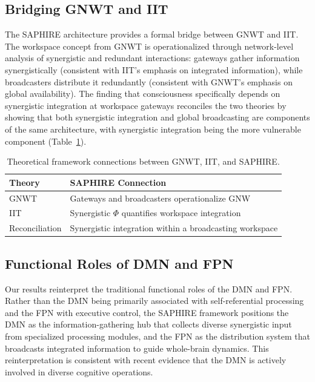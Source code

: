 \documentclass[11pt]{article}
\begin{document}
\subsection{Bridging GNWT and IIT}

The SAPHIRE architecture provides a formal bridge between GNWT and IIT. The workspace concept from GNWT is operationalized through network-level analysis of synergistic and redundant interactions: gateways gather information synergistically (consistent with IIT's emphasis on integrated information), while broadcasters distribute it redundantly (consistent with GNWT's emphasis on global availability). The finding that consciousness specifically depends on synergistic integration at workspace gateways reconciles the two theories by showing that both synergistic integration and global broadcasting are components of the same architecture, with synergistic integration being the more vulnerable component (Table~\ref{tab:theories}).

\begin{table}[htbp]
\centering
\caption{Theoretical framework connections between GNWT, IIT, and SAPHIRE.}
\label{tab:theories}
\begin{tabular}{ll}
\toprule
Theory & SAPHIRE Connection \\
\midrule
GNWT & Gateways and broadcasters operationalize GNW \\
IIT & Synergistic $\Phi$ quantifies workspace integration \\
Reconciliation & Synergistic integration within a broadcasting workspace \\
\bottomrule
\end{tabular}
\end{table}

\subsection{Functional Roles of DMN and FPN}

Our results reinterpret the traditional functional roles of the DMN and FPN. Rather than the DMN being primarily associated with self-referential processing and the FPN with executive control, the SAPHIRE framework positions the DMN as the information-gathering hub that collects diverse synergistic input from specialized processing modules, and the FPN as the distribution system that broadcasts integrated information to guide whole-brain dynamics. This reinterpretation is consistent with recent evidence that the DMN is actively involved in diverse cognitive operations.
\end{document}
